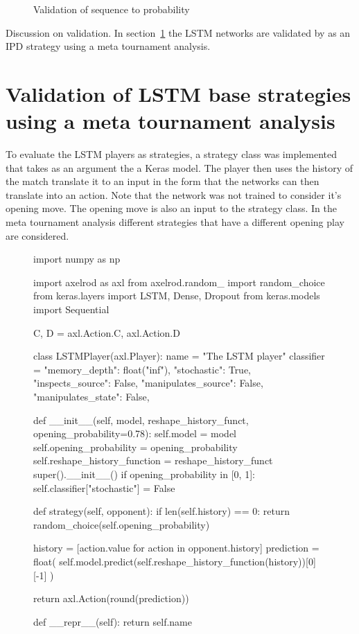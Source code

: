 \begin{figure}[!htbp]
\begin{subfigure}{\textwidth}
    \end{subfigure}
    \caption{Validation of sequence to probability}\label{fig:validation_sequence_to_probability}
\end{figure}

Discussion on validation. In section~\ref{section:rnn_strategy_validation} the
LSTM networks are validated by as an IPD strategy using a meta tournament
analysis.

\section{Validation of LSTM base strategies using a meta tournament analysis}\label{section:rnn_strategy_validation}

To evaluate the LSTM players as strategies, a strategy class was implemented
that takes as an argument the a Keras model. The player then uses the history
of the match translate it to an input in the form that the networks can then
translate into an action. Note that the network was not trained to consider
it's opening move. The opening move is also an input to the strategy class.
In the meta tournament analysis different strategies that have a different
opening play are considered.

\begin{figure}[!htbp]
\begin{sourcepy}
import numpy as np

import axelrod as axl
from axelrod.random_ import random_choice
from keras.layers import LSTM, Dense, Dropout
from keras.models import Sequential

C, D = axl.Action.C, axl.Action.D


class LSTMPlayer(axl.Player):
    name = "The LSTM player"
    classifier = {
        "memory_depth": float("inf"),
        "stochastic": True,
        "inspects_source": False,
        "manipulates_source": False,
        "manipulates_state": False,
    }

    def __init__(self, model, reshape_history_funct, opening_probability=0.78):
        self.model = model
        self.opening_probability = opening_probability
        self.reshape_history_function = reshape_history_funct
        super().__init__()
        if opening_probability in [0, 1]:
            self.classifier["stochastic"] = False

    def strategy(self, opponent):
        if len(self.history) == 0:
            return random_choice(self.opening_probability)

        history = [action.value for action in opponent.history]
        prediction = float(
            self.model.predict(self.reshape_history_function(history))[0][-1]
        )

        return axl.Action(round(prediction))

    def __repr__(self):
        return self.name
\end{sourcepy}
\end{figure}

